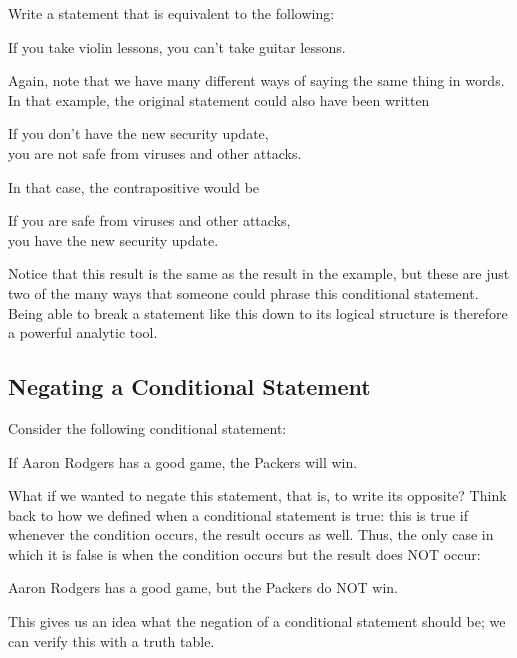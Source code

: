 \begin{try}
Write a statement that is equivalent to the following:
\begin{center}
If you take violin lessons, you can't take guitar lessons.
\end{center}
\end{try}

Again, note that we have many different ways of saying the same thing in words.  In that example, the original statement could also have been written
\begin{center}
If you don't have the new security update,\\
you are not safe from viruses and other attacks.
\end{center}
In that case, the contrapositive would be
\begin{center}
If you are safe from viruses and other attacks,\\
you have the new security update.
\end{center}

Notice that this result is the same as the result in the example, but these are just two of the many ways that someone could phrase this conditional statement.  Being able to break a statement like this down to its logical structure is therefore a powerful analytic tool.

\subsection{Negating a Conditional Statement}
Consider the following conditional statement:
\begin{center}
If Aaron Rodgers has a good game, the Packers will win.
\end{center}
What if we wanted to negate this statement, that is, to write its opposite?  Think back to how we defined when a conditional statement is true: this is true if whenever the condition occurs, the result occurs as well.  Thus, the only case in which it is false is when the condition occurs but the result does NOT occur:
\begin{center}
Aaron Rodgers has a good game, but the Packers do NOT win.
\end{center}
This gives us an idea what the negation of a conditional statement should be; we can verify this with a truth table.

